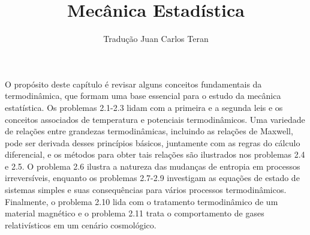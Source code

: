 \documentclass[12pt]{article}
\begin{document}
\medskip
\author{Tradução Juan Carlos Teran}
\title{Mecânica Estadística}
\maketitle
O propósito deste capítulo é revisar alguns conceitos fundamentais da termodinâmica, que formam uma base essencial para o estudo da mecânica estatística. Os problemas 2.1-2.3 lidam com a primeira e a segunda leis e os conceitos associados de temperatura e potenciais termodinâmicos. Uma variedade de relações entre grandezas termodinâmicas, incluindo as relações de Maxwell, pode ser derivada desses princípios básicos, juntamente com as regras do cálculo diferencial, e os métodos para obter tais relações são ilustrados nos problemas 2.4 e 2.5. O problema 2.6 ilustra a natureza das mudanças de entropia em processos irreversíveis, enquanto os problemas 2.7-2.9 investigam as equações de estado de sistemas simples e suas consequências para vários processos termodinâmicos. Finalmente, o problema 2.10 lida com o tratamento termodinâmico de um material magnético e o problema 2.11 trata o comportamento de gases relativísticos em um cenário cosmológico.
\end{document}
